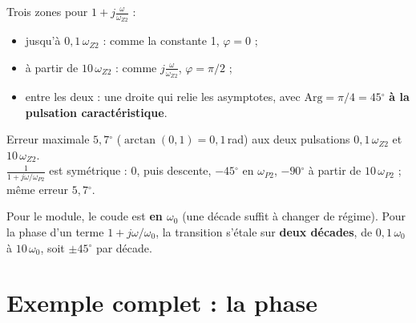 \begin{propbox}[title={Termes 4 et 5 : $1 + j\frac\omega{\omega_{Z2}}$ et $\frac1{1 + j\omega/\omega_{P2}}$}]
Trois zones pour $1 + j\frac\omega{\omega_{Z2}}$ :
\begin{itemize}
  \item jusqu'à $0{,}1\,\omega_{Z2}$ : comme la constante 1, \textbf{$\varphi = 0$} ;
  \item à partir de $10\,\omega_{Z2}$ : comme $j\frac\omega{\omega_{Z2}}$,
        \textbf{$\varphi = \pi/2$} ;
  \item entre les deux : une droite qui relie les asymptotes, avec
        $\mathrm{Arg} = \pi/4 = 45\ensuremath{^\circ}$ \textbf{à la pulsation caractéristique}.
\end{itemize}
Erreur maximale \textbf{$5{,}7\ensuremath{^\circ}$} ($\arctan(0{,}1) = 0{,}1$\,rad) aux deux pulsations
$0{,}1\,\omega_{Z2}$ et $10\,\omega_{Z2}$. \\
$\frac1{1 + j\omega/\omega_{P2}}$ est symétrique : $0$, puis descente, $-45\ensuremath{^\circ}$ en $\omega_{P2}$,
$-90\ensuremath{^\circ}$ à partir de $10\,\omega_{P2}$ ; même erreur $5{,}7\ensuremath{^\circ}$.
\end{propbox}

\begin{warnbox}[title={Module vs phase : pas les mêmes coudes}]
Pour le module, le coude est \textbf{en $\omega_0$} (une décade suffit à changer de
régime). Pour la phase d'un terme $1 + j\omega/\omega_0$, la transition s'étale sur
\textbf{deux décades}, de $0{,}1\,\omega_0$ à $10\,\omega_0$, soit $\pm45\ensuremath{^\circ}$ par décade.
\end{warnbox}

\section{Exemple complet : la phase}


